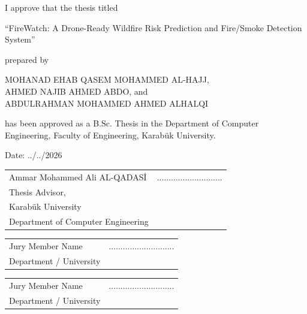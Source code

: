 \clearpage

\thispagestyle{empty}
\vspace*{1cm}

\noindent I approve that the thesis titled

\vspace{0.5cm}

\begin{center}
``FireWatch: A Drone-Ready Wildfire Risk Prediction and Fire/Smoke Detection System''
\end{center}

\vspace{0.5cm}

\noindent prepared by

\vspace{0.5cm}

\begin{center}
MOHANAD EHAB QASEM MOHAMMED AL-HAJJ,\\
AHMED NAJIB AHMED ABDO, and\\
ABDULRAHMAN MOHAMMED AHMED ALHALQI
\end{center}

\vspace{0.5cm}

\noindent has been approved as a B.Sc. Thesis in the Department of Computer Engineering,
Faculty of Engineering, Karabük University.

\vspace{1.2cm}

\noindent Date: ../../2026

\vspace{1.4cm}

\noindent
\begin{tabular}{p{8cm}p{5cm}}
Ammar Mohammed Ali AL-QADAS\.{I} & ............................ \\
Thesis Advisor, & \\
Karabük University & \\
Department of Computer Engineering & \\
\end{tabular}

\vspace{1.4cm}

\noindent
\begin{tabular}{p{8cm}p{5cm}}
Jury Member Name & ............................ \\
Department / University & \\
\end{tabular}

\vspace{1.4cm}

\noindent
\begin{tabular}{p{8cm}p{5cm}}
Jury Member Name & ............................ \\
Department / University & \\
\end{tabular}

\clearpage
